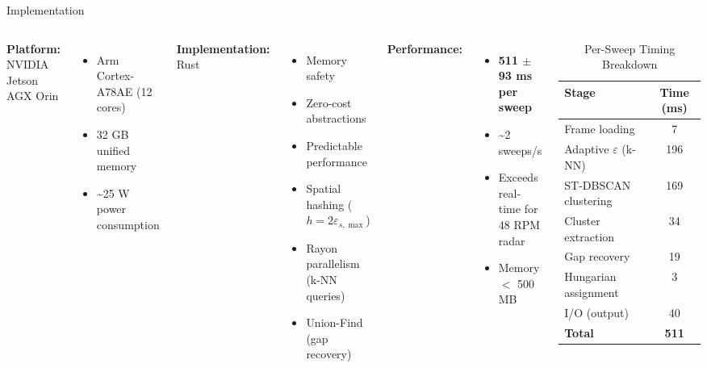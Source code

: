 \documentclass[aspectratio=169, 10pt]{beamer}
\begin{document}
\begin{frame}{Implementation}
\scriptsize
\begin{columns}[T]
\textbf{Platform:} NVIDIA Jetson AGX Orin
\begin{itemize}
  \setlength{\itemsep}{0pt}
  \item Arm Cortex-A78AE (12 cores)
  \item 32 GB unified memory
  \item \textasciitilde 25 W power consumption
\end{itemize}

\vspace{0.15cm}
\textbf{Implementation:} Rust
\begin{itemize}
  \setlength{\itemsep}{0pt}
  \item Memory safety
  \item Zero-cost abstractions
  \item Predictable performance
  \item \textcolor{Congaree}{Spatial hashing} ($h = 2\varepsilon_{s,\max}$)
  \item \textcolor{Congaree}{Rayon parallelism} (k-NN queries)
  \item \textcolor{Congaree}{Union-Find} (gap recovery)
\end{itemize}

\vspace{0.15cm}
\textbf{Performance:}
\begin{itemize}
  \setlength{\itemsep}{0pt}
  \item \textcolor{Rose}{\textbf{511 $\pm$ 93 ms per sweep}}
  \item \textasciitilde 2 sweeps/s
  \item Exceeds real-time for 48 RPM radar
  \item Memory $<$ 500 MB
\end{itemize}

\begin{table}
\centering
\scriptsize
\caption{Per-Sweep Timing Breakdown}
\begin{tabular}{@{}lc@{}}
\toprule
\textbf{Stage} & \textbf{Time (ms)} \\
\midrule
Frame loading & 7 \\
Adaptive $\varepsilon$ (k-NN) & 196 \\
ST-DBSCAN clustering & 169 \\
Cluster extraction & 34 \\
Gap recovery & 19 \\
Hungarian assignment & 3 \\
I/O (output) & 40 \\
\midrule
\textbf{Total} & \textbf{511} \\
\bottomrule
\end{tabular}
\end{table}


\end{columns}
\end{frame}
\end{document}
